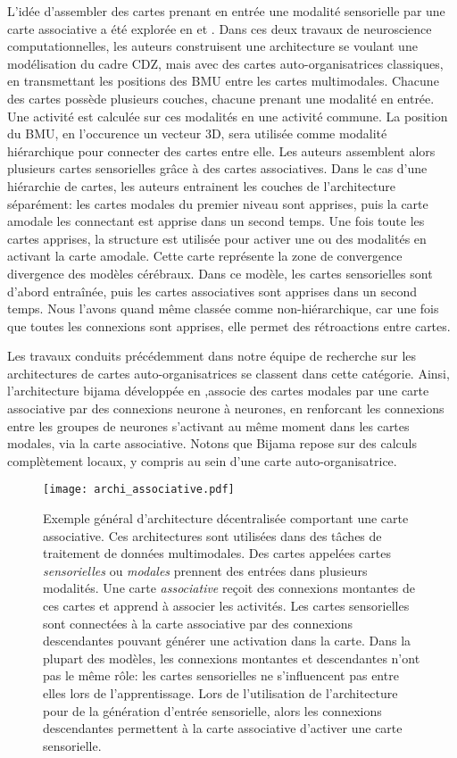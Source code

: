 \documentclass[../main]{subfiles}
\begin{document}
L'idée d'assembler des cartes prenant en entrée une modalité sensorielle par une carte associative a été explorée en \cite{dominey13} et \cite{escobar-juarez_self-organized_2016}.
Dans ces deux travaux de neuroscience computationnelles, les auteurs construisent une architecture se voulant une modélisation du cadre CDZ, mais avec des cartes auto-organisatrices classiques, en transmettant les positions des BMU entre les cartes multimodales. 
Chacune des cartes possède plusieurs couches, chacune prenant une modalité en entrée. Une activité est calculée sur ces modalités en une activité commune. La position du BMU, en l'occurence un vecteur 3D, sera utilisée comme modalité hiérarchique pour connecter des cartes entre elle. Les auteurs assemblent alors plusieurs cartes sensorielles grâce à des cartes associatives.
Dans le cas d'une hiérarchie de cartes, les auteurs entrainent les couches de l'architecture séparément: les cartes modales du premier niveau sont apprises, puis la carte amodale les connectant est apprise dans un second temps. 
Une fois toute les cartes apprises, la structure est utilisée pour activer une ou des modalités en activant la carte amodale. Cette carte représente la zone de convergence divergence des modèles cérébraux. 
Dans ce modèle, les cartes sensorielles sont d'abord entraînée, puis les cartes associatives sont apprises dans un second temps. Nous l'avons quand même classée comme non-hiérarchique, car une fois que toutes les connexions sont apprises, elle permet des rétroactions entre cartes. 

Les travaux conduits précédemment dans notre équipe de recherche sur les architectures de cartes auto-organisatrices se classent dans cette catégorie. Ainsi, l'architecture bijama développée en \cite{menard05,khouzam_2013},associe des cartes modales par une carte associative par des connexions neurone à neurones, en renforcant les connexions entre les groupes de neurones s'activant au même moment dans les cartes modales, via la carte associative.
Notons que Bijama repose sur des calculs complètement locaux, y compris au sein d'une carte auto-organisatrice.



\begin{figure}
    \texttt{[image: archi\_associative.pdf]}
    \caption{Exemple général d'architecture décentralisée comportant une carte associative. Ces architectures sont utilisées dans des tâches de traitement de données multimodales.
     Des cartes appelées cartes \emph{sensorielles} ou \emph{modales} prennent des entrées dans plusieurs modalités. Une carte \emph{associative} reçoit des connexions montantes de ces cartes et apprend à associer les activités. Les cartes sensorielles sont connectées à la carte associative par des connexions descendantes pouvant générer une activation dans la carte. Dans la plupart des modèles, les connexions montantes et descendantes n'ont pas le même rôle: les cartes sensorielles ne s'influencent pas entre elles lors de l'apprentissage.
     Lors de l'utilisation de l'architecture pour de la génération d'entrée sensorielle, alors les connexions descendantes permettent à la carte associative d'activer une carte sensorielle. \label{fig:archi_associative}
     }
\end{figure}
\end{document}
